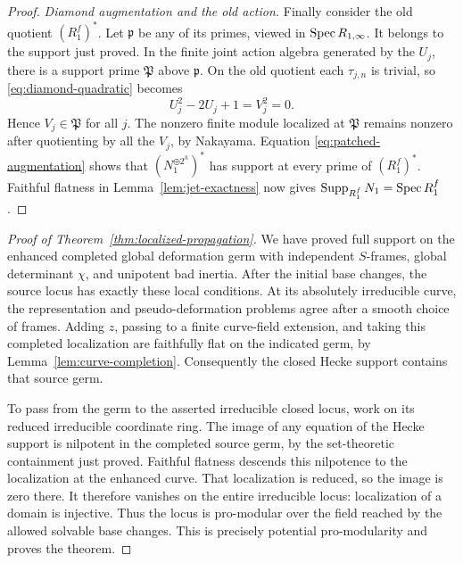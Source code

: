 \begin{proof}
\emph{Diamond augmentation and the old action.}
Finally consider the old quotient $(R_1^f)^*$.  Let
$\mathfrak p$ be any of its primes, viewed in
$\operatorname{Spec} R_{1,\infty}$.  It belongs to the support just proved.
In the finite joint action algebra generated by the $U_j$,
there is a support prime $\mathfrak P$ above $\mathfrak p$.
On the old quotient each $\tau_{j,n}$ is trivial, so
\eqref{eq:diamond-quadratic} becomes
\[
 U_j^2-2U_j+1=V_j^2=0.
\]
Hence $V_j\in\mathfrak P$ for all $j$.  The nonzero finite
module localized at $\mathfrak P$ remains nonzero after
quotienting by all the $V_j$, by Nakayama.  Equation
\eqref{eq:patched-augmentation} shows that
$(N_1^{\oplus2^h})^*$ has support at every prime of
$(R_1^f)^*$.  Faithful flatness in
Lemma~\ref{lem:jet-exactness} now gives
$\operatorname{Supp}_{R_1^f}N_1=\operatorname{Spec} R_1^f$.
\end{proof}

\begin{proof}[Proof of Theorem~\ref{thm:localized-propagation}]
We have proved full support on the enhanced completed global
deformation germ with independent $S$-frames, global determinant
$\chi$, and unipotent bad inertia.  After the initial base
changes, the source locus has exactly these local conditions.
At its absolutely irreducible curve, the representation and
pseudo-deformation problems agree after a smooth choice of
frames.  Adding $z$, passing to a finite curve-field extension,
and taking this completed localization are faithfully flat on
the indicated germ, by Lemma~\ref{lem:curve-completion}.
Consequently the closed Hecke support contains that source germ.

To pass from the germ to the asserted irreducible closed locus,
work on its reduced irreducible coordinate ring.  The image of
any equation of the Hecke support is nilpotent in the completed
source germ, by the set-theoretic containment just proved.
Faithful flatness descends this nilpotence to the localization
at the enhanced curve.  That localization is reduced, so the
image is zero there.  It therefore vanishes on the entire
irreducible locus: localization of a domain is injective.
Thus the locus is pro-modular over the field reached
by the allowed solvable base changes.  This is precisely
potential pro-modularity and proves the theorem.
\end{proof}
